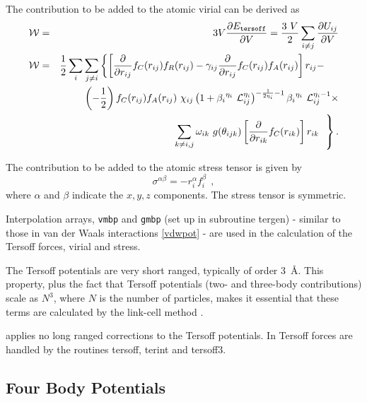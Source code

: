 The contribution to be added to the atomic virial can be derived
as
\begin{eqnarray}
{\cal W} &=& 3V \frac{\partial E_{\tt tersoff}}{\partial V} =
\frac{3~V}{2} \sum_{i \neq j} \frac{\partial U_{ij}}{\partial V} \\
{\cal W} &=& \frac{1}{2} \sum_{i} \sum_{j \neq i} \left\{ \left[
\frac{\partial}{\partial r_{ij}} f_{C}(r_{ij}) f_{R}(r_{ij}) -
\gamma_{ij} \frac{\partial}{\partial r_{ij}} f_{C}(r_{ij}) f_{A}(r_{ij})
\right] r_{ij} - \right.~~~~\nonumber \\
& & ~~~~\left( -\frac{1}{2} \right) f_{C}(r_{ij}) f_{A}(r_{ij})~\chi_{ij}
\left( 1 + {\beta_{i}}^{\eta_{i}}~{\cal{L}}_{ij}^{\eta_{i}} \right)^{-\frac{1}{2 \eta_{i}} - 1}
{\beta_{i}}^{\eta_{i}}~{\cal{L}}_{ij}^{\eta_{i}-1} \times \\
& & \left. ~~~~\sum_{k \neq i,j} \omega_{ik}~g(\theta_{ijk}) \left[
\frac{\partial}{\partial r_{ik}} f_{C}(r_{ik}) \right] r_{ik}~~ \right\}.
\nonumber
\end{eqnarray}

The contribution to be added to the atomic stress
tensor is given by
\begin{equation}
\sigma^{\alpha \beta} = -r_{i}^{\alpha} f_{i}^{\beta}~~,
\end{equation}
where $\alpha$ and $\beta$ indicate the $x,y,z$ components.  The
stress tensor is symmetric.

Interpolation arrays, {\tt vmbp} and {\tt gmbp} (set up in subroutine
{\sc tergen}) - similar to those in van der Waals
interactions \ref{vdwpot} - are used in the calculation of the Tersoff
forces, virial and stress.

The Tersoff potentials are very short
ranged, typically of order $3$~\AA.  This property, plus the fact
that Tersoff potentials (two- and
three-body contributions) scale as $N^{3}$, where $N$ is the number
of particles, makes it essential that these terms are calculated by
the link-cell method \cite{eastwood-80a}.

\D{} applies no long ranged corrections to the
Tersoff potentials.  In \D{} Tersoff forces
are handled by the routines {\sc tersoff, terint} and {\sc tersoff3}.

\subsection{Four Body Potentials}

